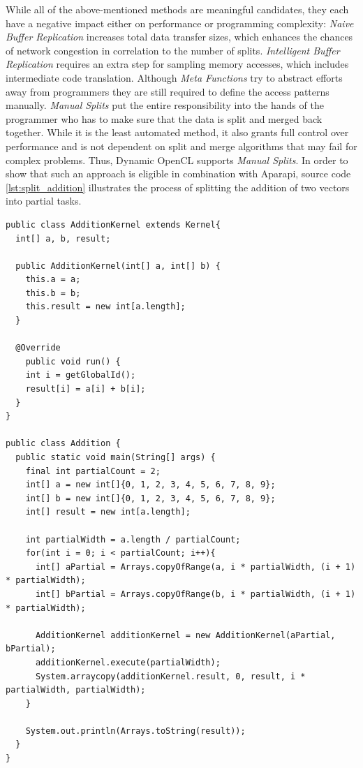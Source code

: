 While all of the above-mentioned methods are meaningful candidates, they each have a negative impact either on performance or programming complexity: \textit{Naive Buffer Replication} increases total data transfer sizes, which enhances the chances of network congestion in correlation to the number of splits. \textit{Intelligent Buffer Replication} requires an extra step for sampling memory accesses, which includes intermediate code translation. Although \textit{Meta Functions} try to abstract efforts away from programmers they are still required to define the access patterns manually. \textit{Manual Splits} put the entire responsibility into the hands of the programmer who has to make sure that the data is split and merged back together. While it is the least automated method, it also grants full control over performance and is not dependent on split and merge algorithms that may fail for complex problems. Thus, Dynamic OpenCL supports \textit{Manual Splits}. In order to show that such an approach is eligible in combination with Aparapi, source code \ref{lst:split_addition} illustrates the process of splitting the addition of two vectors into partial tasks.


\begin{lstlisting}[caption=Partial Aparapi Vector Addition Kernel,captionpos=b,label=lst:split_addition]
public class AdditionKernel extends Kernel{
  int[] a, b, result;

  public AdditionKernel(int[] a, int[] b) {
    this.a = a;
    this.b = b;
    this.result = new int[a.length];
  }

  @Override
    public void run() {
    int i = getGlobalId();
    result[i] = a[i] + b[i];
  }
}

public class Addition {
  public static void main(String[] args) {
    final int partialCount = 2;
	int[] a = new int[]{0, 1, 2, 3, 4, 5, 6, 7, 8, 9};
	int[] b = new int[]{0, 1, 2, 3, 4, 5, 6, 7, 8, 9};
	int[] result = new int[a.length];

	int partialWidth = a.length / partialCount;
	for(int i = 0; i < partialCount; i++){
      int[] aPartial = Arrays.copyOfRange(a, i * partialWidth, (i + 1) * partialWidth);
      int[] bPartial = Arrays.copyOfRange(b, i * partialWidth, (i + 1) * partialWidth);

	  AdditionKernel additionKernel = new AdditionKernel(aPartial, bPartial);
      additionKernel.execute(partialWidth);
      System.arraycopy(additionKernel.result, 0, result, i * partialWidth, partialWidth);
	}

	System.out.println(Arrays.toString(result));
  }
}

\end{lstlisting}

